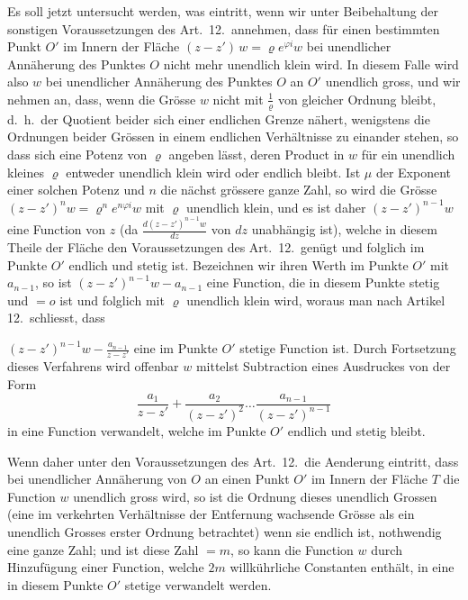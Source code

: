 \documentclass{article}
\begin{document}
Es soll jetzt untersucht werden, was eintritt, wenn wir unter Beibehaltung der sonstigen Voraussetzungen des Art.~12.\ annehmen, dass für einen bestimmten Punkt $O'$ im Innern der Fläche $(z - z')\,w = \varrho e^{\varphi i}w$ bei unendlicher Annäherung des Punktes $O$ nicht mehr unendlich klein wird. In diesem Falle wird also $w$ bei unendlicher Annäherung des Punktes $O$ an $O'$ unendlich gross, und wir nehmen an, dass, wenn die Grösse $w$ nicht mit $\frac{1}{\varrho}$ von gleicher Ordnung bleibt, d.\ h.\ der Quotient beider sich einer endlichen Grenze nähert, wenigstens die Ordnungen beider Grössen in einem endlichen Verhältnisse zu einander stehen, so dass sich eine Potenz von $\varrho$ angeben lässt, deren Product in $w$ für ein unendlich kleines $\varrho$ entweder unendlich klein wird oder endlich bleibt. Ist $\mu$ der Exponent einer solchen Potenz und $n$ die nächst grössere ganze Zahl, so wird die Grösse $(z - z')^n w = \varrho^n e^{n\varphi i} w$ mit $\varrho$ unendlich klein, und es ist daher $(z - z')^{n-1} w$ eine Function von $z$ (da $\frac{d(z - z')^{n-1} w}{dz}$ von $dz$ unabhängig ist), welche in diesem Theile der Fläche den Voraussetzungen des Art.~12.\ genügt und folglich im Punkte $O'$ endlich und stetig ist. Bezeichnen wir ihren Werth im Punkte $O'$ mit $a_{n-1}$, so ist $(z - z')^{n-1} w - a_{n-1}$ eine Function, die in diesem Punkte stetig und $= o$ ist und folglich mit $\varrho$ unendlich klein wird, woraus man nach Artikel 12.\ schliesst, dass

$(z - z')^{n-1}w - \frac{a_{n-1}}{z - z'}$ eine im Punkte $O'$ stetige Function ist. Durch Fortsetzung dieses Verfahrens wird offenbar $w$ mittelst Subtraction eines Ausdruckes von der Form
\[
\frac{a_1}{z - z'} + \frac{a_2}{(z - z')^2} \dots \frac{a_{n-1}}{(z - z')^{n-1}}
\]
in eine Function verwandelt, welche im Punkte $O'$ endlich und stetig bleibt.

Wenn daher unter den Voraussetzungen des Art.~12.\ die Aenderung eintritt, dass bei unendlicher Annäherung von $O$ an einen Punkt $O'$ im Innern der Fläche $T$ die Function $w$ unendlich gross wird, so ist die Ordnung dieses unendlich Grossen (eine im verkehrten Verhältnisse der Entfernung wachsende Grösse als ein unendlich Grosses erster Ordnung betrachtet) wenn sie endlich ist, nothwendig eine ganze Zahl; und ist diese Zahl $= m$, so kann die Function $w$ durch Hinzufügung einer Function, welche $2m$ willkührliche Constanten enthält, in eine in diesem Punkte $O'$ stetige verwandelt werden.
\end{document}
